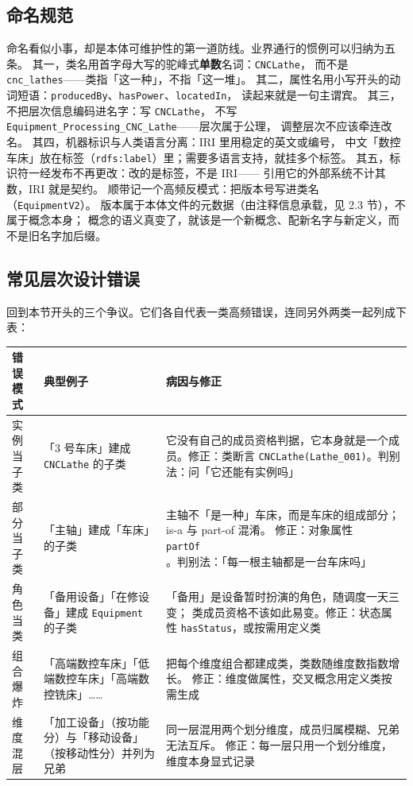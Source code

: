 \subsection{命名规范}

命名看似小事，却是本体可维护性的第一道防线。业界通行的惯例可以归纳为五条。
其一，类名用首字母大写的驼峰式\textbf{单数}名词：\texttt{CNCLathe}，
而不是 \texttt{cnc\_lathes}——类指「这一种」，不指「这一堆」。
其二，属性名用小写开头的动词短语：\texttt{producedBy}、\texttt{hasPower}、\texttt{locatedIn}，
读起来就是一句主谓宾。
其三，不把层次信息编码进名字：写 \texttt{CNCLathe}，
不写 \texttt{Equipment\_Processing\_CNC\_Lathe}——层次属于公理，
调整层次不应该牵连改名。
其四，机器标识与人类语言分离：IRI 里用稳定的英文或编号，
中文「数控车床」放在标签（\texttt{rdfs:label}）里；需要多语言支持，就挂多个标签。
其五，标识符一经发布不再更改：改的是标签，不是 IRI——
引用它的外部系统不计其数，IRI 就是契约。
顺带记一个高频反模式：把版本号写进类名（\texttt{EquipmentV2}）。
版本属于本体文件的元数据（由注释信息承载，见 2.3 节），不属于概念本身；
概念的语义真变了，就该是一个新概念、配新名字与新定义，而不是旧名字加后缀。

\subsection{常见层次设计错误}

回到本节开头的三个争议。它们各自代表一类高频错误，连同另外两类一起列成下表：

\begin{center}
\begin{tabularx}{\linewidth}{@{}lXX@{}}
\toprule
\textbf{错误模式} & \textbf{典型例子} & \textbf{病因与修正} \\
\midrule
实例当子类 & 「3 号车床」建成 \texttt{CNCLathe} 的子类 &
它没有自己的成员资格判据，它本身就是一个成员。修正：类断言
\texttt{CNCLathe(Lathe\_001)}。判别法：问「它还能有实例吗」 \\
部分当子类 & 「主轴」建成「车床」的子类 &
主轴不「是一种」车床，而是车床的组成部分；is-a 与 part-of 混淆。
修正：对象属性 \texttt{partOf}。判别法：「每一根主轴都是一台车床吗」 \\
角色当类 & 「备用设备」「在修设备」建成 \texttt{Equipment} 的子类 &
「备用」是设备暂时扮演的角色，随调度一天三变；
类成员资格不该如此易变。修正：状态属性 \texttt{hasStatus}，或按需用定义类 \\
组合爆炸 & 「高端数控车床」「低端数控车床」「高端数控铣床」…… &
把每个维度组合都建成类，类数随维度数指数增长。
修正：维度做属性，交叉概念用定义类按需生成 \\
维度混层 & 「加工设备」（按功能分）与「移动设备」（按移动性分）并列为兄弟 &
同一层混用两个划分维度，成员归属模糊、兄弟无法互斥。
修正：每一层只用一个划分维度，维度本身显式记录 \\
\bottomrule
\end{tabularx}
\end{center}

